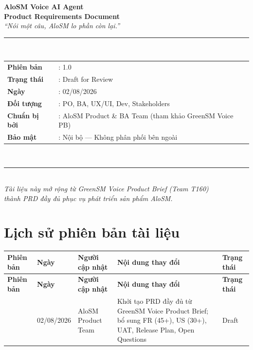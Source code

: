 \documentclass[12pt,a4paper]{article}
\newcommand{\statusdraft}{\colorbox{StatusDraft}{\small Draft}}
\begin{document}

\begin{titlepage}
  \pagecolor{AloBlue}\color{white}
  \vspace*{1.5cm}
  \begin{center}
    {\Huge\bfseries AloSM Voice AI Agent}\\[0.4cm]
    {\large\bfseries Product Requirements Document}\\[0.3cm]
    {\normalsize\itshape ``Nói một câu, AloSM lo phần còn lại.''}\\[1.5cm]
    \noindent\rule{10cm}{0.5pt}\\[0.8cm]
    \begin{tabular}{ll}
      \textbf{Phiên bản}  & : 1.0 \\[4pt]
      \textbf{Trạng thái} & : Draft for Review \\[4pt]
      \textbf{Ngày}       & : 02/08/2026 \\[4pt]
      \textbf{Đối tượng}  & : PO, BA, UX/UI, Dev, Stakeholders \\[4pt]
      \textbf{Chuẩn bị bởi} & : AloSM Product \& BA Team (tham khảo GreenSM Voice PB) \\[4pt]
      \textbf{Bảo mật}    & : Nội bộ --- Không phân phối bên ngoài \\
    \end{tabular}\\[1.5cm]
    \noindent\rule{10cm}{0.5pt}\\[0.8cm]
    {\small\itshape Tài liệu này mở rộng từ GreenSM Voice Product Brief (Team T160)\\
    thành PRD đầy đủ phục vụ phát triển sản phẩm AloSM.}
  \end{center}
  \vfill
\end{titlepage}
\nopagecolor
\setcounter{page}{1}

\section*{Lịch sử phiên bản tài liệu}
\begin{longtable}{C{1.5cm} C{2.2cm} L{3cm} L{5.5cm} C{2.5cm}}
  \toprule
  \textbf{Phiên bản}&\textbf{Ngày}&\textbf{Người cập nhật}&\textbf{Nội dung thay đổi}&\textbf{Trạng thái}\\
  \midrule\endfirsthead
  \toprule{}\textbf{Phiên bản}&\textbf{Ngày}&\textbf{Người cập nhật}&\textbf{Nội dung thay đổi}&\textbf{Trạng thái}\\\midrule\endhead\bottomrule{} & 02/08/2026 & AloSM Product Team & Khởi tạo PRD đầy đủ từ GreenSM Voice Product Brief; bổ sung FR (45+), US (30+), UAT, Release Plan, Open Questions & \statusdraft \\
\end{longtable}
\end{document}
